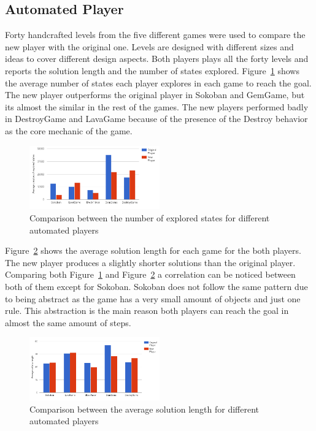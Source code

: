\documentclass[letterpaper]{article}
\newcommand{\figref}[1]{Figure~\ref{Figure:#1}}
\begin{document}
\subsection{Automated Player}
Forty handcrafted levels from the five different games were used to compare the new player with the original one. Levels are designed with different sizes and ideas to cover different design aspects. Both players plays all the forty levels and reports the solution length and the number of states explored. \figref{automatedPlayerPerformance} shows the average number of states each player explores in each game to reach the goal. The new player outperforms the original player in Sokoban and GemGame, but its almost the similar in the rest of the games. The new players performed badly in DestroyGame and LavaGame because of the presence of the Destroy behavior as the core mechanic of the game.\\\par

\begin{figure}
  	\centering
    \includegraphics[width=0.5\textwidth]{Images/automatedPlayerPerformance}
    \caption{Comparison between the number of explored states for different automated players}
    \label{Figure:automatedPlayerPerformance}
\end{figure}

\figref{automatedPlayerLength} shows the average solution length for each game for the both players. The new player produces  a slightly shorter solutions than the original player. Comparing both \figref{automatedPlayerPerformance} and \figref{automatedPlayerLength} a correlation can be noticed between both of them except for Sokoban. Sokoban does not follow the same pattern due to being abstract as the game has a very small amount of objects and just one rule. This abstraction is the main reason both players can reach the goal in almost the same amount of steps.

\begin{figure}
  	\centering
    \includegraphics[width=0.5\textwidth]{Images/automatedPlayerLength}
    \caption{Comparison between the average solution length for different automated players}
    \label{Figure:automatedPlayerLength}
\end{figure}
\end{document}

